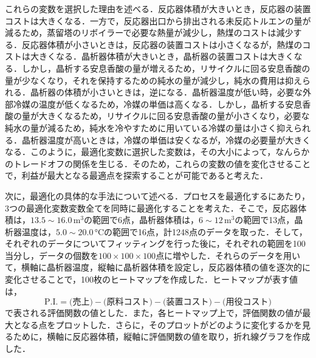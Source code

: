 \documentclass[a4j]{jsreport}
\begin{document}
これらの変数を選択した理由を述べる．反応器体積が大きいとき，反応器の装置コストは大きくなる．一方で，反応器出口から排出される未反応トルエンの量が減るため，蒸留塔のリボイラーで必要な熱量が減少し，熱煤のコストは減少する．反応器体積が小さいときは，反応器の装置コストは小さくなるが，熱煤のコストは大きくなる．晶析器体積が大きいとき，晶析器の装置コストは大きくなる．しかし，晶析する安息香酸の量が増えるため，リサイクルに回る安息香酸の量が少なくなり，それを保持するための純水の量が減少し，純水の費用は抑えられる．晶析器の体積が小さいときは，逆になる．晶析器温度が低い時，必要な外部冷媒の温度が低くなるため，冷媒の単価は高くなる．しかし，晶析する安息香酸の量が大きくなるため，リサイクルに回る安息香酸の量が小さくなり，必要な純水の量が減るため，純水を冷やすために用いている冷媒の量は小さく抑えられる．晶析器温度が高いときは，冷媒の単価は安くなるが，冷媒の必要量が大きくなる．このように，最適化変数に選択した変数は，その大小によって，なんらかのトレードオフの関係を生じる．そのため，これらの変数の値を変化させることで，利益が最大となる最適点を探索することが可能であると考えた．

次に，最適化の具体的な手法について述べる．プロセスを最適化するにあたり，3つの最適化変数変数全てを同時に最適化することを考えた．そこで，反応器体積は，$13.5 \sim 16.0 \, \si{\cubic \metre}$の範囲で6点，晶析器体積は，$6 \sim 12 \, \si{\cubic \metre}$の範囲で13点，晶析器温度は，$5.0 \sim 20.0 \, \si{\degreeCelsius}$の範囲で16点，計1248点のデータを取った．そして，それぞれのデータについてフィッティングを行った後に，それぞれの範囲を100当分し，データの個数を$100 \times 100 \times 100$点に増やした．それらのデータを用いて，横軸に晶析器温度，縦軸に晶析器体積を設定し，反応器体積の値を逐次的に変化させることで，100枚のヒートマップを作成した．ヒートマップが表す値は，
\begin{equation}
  \text{P.I.} = \text{(売上)} - \text{(原料コスト)} - \text{(装置コスト)} -\text{(用役コスト)}
\end{equation}
で表される評価関数の値とした．また，各ヒートマップ上で，評価関数の値が最大となる点をプロットした．さらに，そのプロットがどのように変化するかを見るために，横軸に反応器体積，縦軸に評価関数の値を取り，折れ線グラフを作成した．
\end{document}
